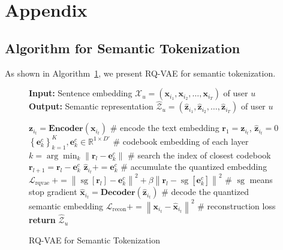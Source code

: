 \section{Appendix}
\subsection{Algorithm for Semantic Tokenization}\label{sec:semantic_token}
As shown in Algorithm~\ref{alg:rq}, we present RQ-VAE for semantic tokenization.
\begin{figure}[!htb]
\vspace{-1em}
\centering
\small
\begin{algorithm}[H]
\caption{RQ-VAE for Semantic Tokenization}\label{alg:rq}
\textbf{Input:} Sentence embedding $\mathcal{X}_{u} = (\boldsymbol{x}_{i_{1}}, \boldsymbol{x}_{i_{2}}, \ldots, \boldsymbol{x}_{i_{T}})$ of user $u$\\
\textbf{Output:} Semantic representation $\hat{\mathcal{Z}}_{u} = (\hat{\boldsymbol{z}}_{i_{1}}, \hat{\boldsymbol{z}}_{i_{2}}, \ldots, \hat{\boldsymbol{z}}_{i_{T}})$ of user $u$\\
\begin{algorithmic}[1]
 \STATE $\boldsymbol{z}_{i_t} = \textbf{Encoder} ({\boldsymbol{x}}_{i_t})$  \# encode the text embedding
\STATE $\boldsymbol{r}_1 = \boldsymbol{z}_{i_t}$, $\hat{\boldsymbol{{z}}}_{i_t} = 0$
            \STATE $\left\{\boldsymbol{e}^c_{k}\right\}_{k=1}^K, \boldsymbol{e}^c_{k} \in \mathbb{R}^{1 \times D'}$ \# codebook embedding of each layer 
        \STATE $k=\arg \min_k\left\|\boldsymbol{r}_{l}-\boldsymbol{e}^c_{k}\right\|$ \# search the index of closest codebook
        \STATE $\boldsymbol{r}_{l + 1} = \boldsymbol{r}_l-\boldsymbol{e}^c_{k}$ 
 \STATE $\hat{\boldsymbol{{z}}}_{i_t} += \boldsymbol{e}^c_{k}$ \# accumulate the quantized embedding
 \STATE $\mathcal{L}_{\text {rqvae }} += \left\|\operatorname{sg}\left[\boldsymbol{r}_l\right]-\boldsymbol{e}^c_{k}\right\|^2+\beta\left\|\boldsymbol{r}_l-\operatorname{sg}\left[\boldsymbol{e}^c_{k}\right]\right\|^2$ \# $\operatorname{sg}$ means stop gradient
    \ENDFOR
 \STATE $\hat{\boldsymbol{x}}_{i_t} = \textbf{Decoder}(\hat{\boldsymbol{z}}_{i_t})$  \# decode the quantized semantic embedding
  \STATE $\mathcal{L}_{\text {recon}} += \left\|\boldsymbol{x}_{i_t} - \hat{\boldsymbol{x}}_{i_t}\right\|^2$ \# reconstruction loss
    \ENDFOR
    \STATE \textbf{return} $\hat{\mathcal{Z}}_{u}$
\end{algorithmic}
\end{algorithm}
\vspace{-1em}
\end{figure}
